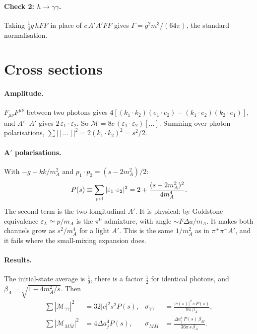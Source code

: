 \documentclass{article}
\newcommand{\Da}{\Delta a}
\begin{document}
\paragraph{Check 2: $h\to\gamma\gamma$.} Taking $\tfrac14 g\,hFF$ in place of $c\,A'A'FF$ gives
$\Gamma=g^2m^3/(64\pi)$, the standard normalisation.

\section{Cross sections}

\paragraph{Amplitude.} $F_{\mu\nu}F^{\mu\nu}$ between two photons gives
$4[(k_1\!\cdot\!k_2)(e_1\!\cdot\!e_2)-(k_1\!\cdot\!e_2)(k_2\!\cdot\!e_1)]$, and
$A'\!\cdot\!A'$ gives $2\,\varepsilon_1\!\cdot\!\varepsilon_2$. So
$\mathcal M=8c\,(\varepsilon_1\!\cdot\!\varepsilon_2)[\dots]$. Summing over photon
polarisations, $\sum|[\dots]|^2=2(k_1\!\cdot\!k_2)^2=s^2/2$.

\paragraph{A$'$ polarisations.} With $-g+kk/m_A^2$ and $p_1\!\cdot\!p_2=(s-2m_A^2)/2$:
\begin{equation}
P(s)\equiv\sum_{\rm pol}|\varepsilon_1\!\cdot\!\varepsilon_2|^2=2+\frac{(s-2m_A^2)^2}{4m_A^4}.
\end{equation}
The second term is the two longitudinal $A'$. It is physical: by Goldstone equivalence
$\varepsilon_L\simeq p/m_A$ is the $\pi^0$ admixture, with angle $\sim F\Da/m_A$. It makes both
channels grow as $s^2/m_A^4$ for a light $A'$. This is the same $1/m_A^2$ as in
$\pi^+\pi^-A'$, and it fails where the small-mixing expansion does.

\paragraph{Results.} The initial-state average is $\tfrac19$, there is a factor $\tfrac12$ for
identical photons, and $\beta_A=\sqrt{1-4m_A^2/s}$. Then
\begin{align}
\sum|\mathcal M_{\gamma\gamma}|^2&=32|c|^2s^2P(s), &
\sigma_{\gamma\gamma}&=\frac{|c(s)|^2\,s\,P(s)}{9\pi\,\beta_A},\\
\sum|\mathcal M_{M\bar M}|^2&=4\Da_j^4P(s), &
\sigma_{M\bar M}&=\frac{\Da_j^4\,P(s)\,\beta_M}{36\pi\,s\,\beta_A}.
\end{align}
\end{document}
